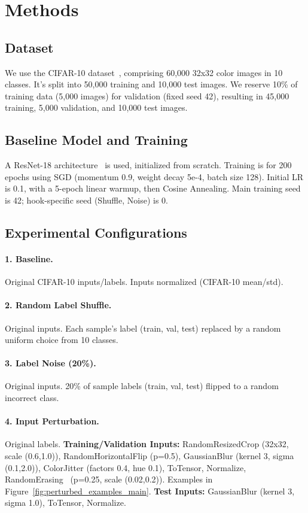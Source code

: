 \documentclass[10pt,twocolumn,letterpaper]{article}
\begin{document}
\section{Methods}
\label{sec:methods}

\subsection{Dataset}
We use the CIFAR-10 dataset~\cite{Krizhevsky2009LearningML}, comprising 60,000 32x32 color images in 10 classes. It's split into 50,000 training and 10,000 test images. We reserve 10\% of training data (5,000 images) for validation (fixed seed 42), resulting in 45,000 training, 5,000 validation, and 10,000 test images.

\subsection{Baseline Model and Training}
A ResNet-18 architecture~\cite{He2016DeepRL} is used, initialized from scratch.
Training is for 200 epochs using SGD (momentum 0.9, weight decay 5e-4, batch size 128). Initial LR is 0.1, with a 5-epoch linear warmup, then Cosine Annealing.
Main training seed is 42; hook-specific seed (Shuffle, Noise) is 0.

\subsection{Experimental Configurations}

\paragraph{1. Baseline.}
Original CIFAR-10 inputs/labels. Inputs normalized (CIFAR-10 mean/std).

\paragraph{2. Random Label Shuffle.}
Original inputs. Each sample's label (train, val, test) replaced by a random uniform choice from 10 classes.

\paragraph{3. Label Noise (20\%).}
Original inputs. 20\% of sample labels (train, val, test) flipped to a random incorrect class.

\paragraph{4. Input Perturbation.}
Original labels.
\textbf{Training/Validation Inputs:} RandomResizedCrop (32x32, scale (0.6,1.0)), RandomHorizontalFlip (p=0.5), GaussianBlur (kernel 3, sigma (0.1,2.0)), ColorJitter (factors 0.4, hue 0.1), ToTensor, Normalize, RandomErasing~\cite{Zhong2020RandomED} (p=0.25, scale (0.02,0.2)). Examples in Figure~\ref{fig:perturbed_examples_main}.
\textbf{Test Inputs:} GaussianBlur (kernel 3, sigma 1.0), ToTensor, Normalize.
\end{document}

